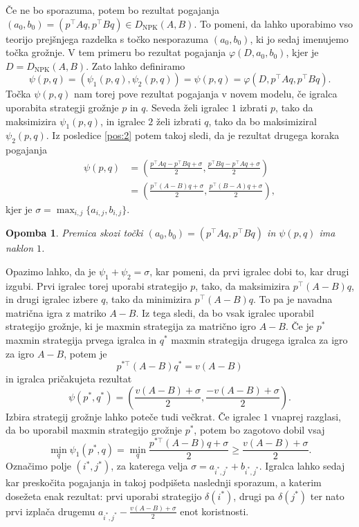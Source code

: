 \documentclass[10pt, a4paper]{article}
\newtheorem*{opomba}{Opomba}
\begin{document}
Če ne bo sporazuma, potem bo rezultat pogajanja $(a_0, b_0) = (p^\top A q, p^\top B q) \in D_{\mathrm{NPK}} (A, B)$.
To pomeni, da lahko uporabimo vso teorijo prejšnjega razdelka s točko nesporazuma 
$(a_0, b_0)$, ki jo sedaj imenujemo {točka grožnje}.
V tem primeru bo rezultat pogajanja $\varphi(D, a_0, b_0)$, kjer je 
$D = D_{\mathrm{NPK}} (A, B)$. Zato lahko definiramo 
$$\psi (p, q) = (\psi_1 (p, q), \psi_2(p, q)) = \psi(p, q) = \varphi (D, p^\top A q, p^\top B q).$$
Točka $\psi(p, q)$ nam torej pove rezultat pogajanja v novem modelu, če igralca uporabita strategji grožnje $p$ in $q$.
Seveda želi igralec $1$ izbrati $p$, tako da maksimizira $\psi_1(p, q)$,
in igralec $2$ želi izbrati $q$, tako da bo maksimiziral $\psi_2(p, q)$.
Iz posledice \ref{pos:2} potem takoj sledi, da je rezultat drugega koraka pogajanja 
\begin{align*}
  \psi(p, q) &= \left(\frac{p^\top Aq - p^\top B q + \sigma}{2}, \frac{p^\top B q - p^\top Aq + \sigma}{2}\right)\\
  &= \left(\frac{p^\top (A - B) q + \sigma}{2}, \frac{p^\top (B - A) q + \sigma}{2}\right),
\end{align*}
kjer je $\sigma = \max_{i, j} \{a_{i, j}, b_{i, j}\}$.

\begin{opomba}
  Premica skozi točki $(a_0, b_0) = (p^\top A q, p^\top B q)$ in $\psi(p, q)$ ima naklon $1$.
\end{opomba}

Opazimo lahko, da je $\psi_1 + \psi_2 = \sigma$, kar pomeni, da prvi igralec dobi to, kar drugi izgubi.
Prvi igralec torej uporabi strategijo $p$, tako, da maksimizira $p^\top (A - B) q$,
in drugi igralec izbere $q$, tako da minimizira $p^\top (A - B) q$. To pa je navadna matrična igra 
z matriko $A - B$. Iz tega sledi, da bo vsak igralec uporabil strategijo grožnje, ki je maxmin 
strategija za matrično igro $A - B$. Če je $p^*$ maxmin strategija prvega igralca in 
$q^*$ maxmin strategija drugega igralca za igro za igro $A - B$,
potem je $$p^{*\top} (A - B) q^* = v(A - B)$$
in igralca pričakujeta rezultat 
$$\psi(p^*, q^*) = \left(\frac{v(A - B) + \sigma}{2}, \frac{-v(A - B) + \sigma}{2}\right).$$
Izbira strategij grožnje lahko poteče tudi večkrat.
Če igralec $1$ vnaprej razglasi, da bo uporabil maxmin strategijo grožnje $p^*$,
potem bo zagotovo dobil vsaj 
$$\min_q \psi_1 (p^*, q) = \min_q \frac{p^{*\top} (A - B) q + \sigma}{2} \geq \frac{v(A - B) + \sigma}{2}.$$
Označimo polje $(i^*, j^*)$, za katerega velja $\sigma = a_{i^*, j^*} + b_{i^*, j^*}$.
Igralca lahko sedaj kar preskočita pogajanja in takoj podpišeta naslednji sporazum, a katerim dosežeta enak rezultat:
prvi uporabi strategijo $\delta(i^*)$, drugi pa $\delta(j^*)$ ter nato prvi izplača drugemu 
$a_{i^*, j^*} - \frac{v(A - B) + \sigma}{2}$ enot koristnosti.
\end{document}
